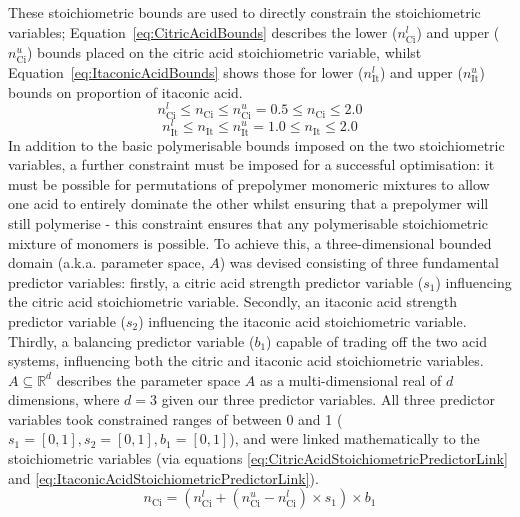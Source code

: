 These stoichiometric bounds are used to directly constrain the stoichiometric 
 variables; Equation~\ref{eq:CitricAcidBounds} describes the lower 
 (\(n_{\text{Ci}}^{l}\)) and upper (\(n_{\text{Ci}}^{u}\)) bounds placed on the citric acid 
 stoichiometric variable, whilst Equation~\ref{eq:ItaconicAcidBounds} 
 shows those for lower (\(n_{\text{It}}^{l}\)) and upper (\(n_{\text{It}}^{u}\))
 bounds on proportion of itaconic acid.
\begin{equation}\label{eq:CitricAcidBounds}
    n_{\text{Ci}}^{l}\leq n_{\text{Ci}}\leq n_{\text{Ci}}^{u}=0.5\leq n_{\text{Ci}}\leq 2.0
\end{equation}
\begin{equation}\label{eq:ItaconicAcidBounds}
    n_{\text{It}}^{l}\leq n_{\text{It}}\leq n_{\text{It}}^{u}=1.0\leq n_{\text{It}}\leq 2.0
\end{equation}
In addition to the basic polymerisable bounds imposed on the two
 stoichiometric variables, a further constraint must be imposed for a
 successful optimisation: it must be possible for permutations of
 prepolymer monomeric mixtures to allow one acid to entirely dominate the
 other whilst ensuring that a prepolymer will still polymerise - this
 constraint ensures that any polymerisable stoichiometric mixture of
 monomers is possible.
To achieve this, a three-dimensional bounded domain (a.k.a. parameter
 space, \(A\)) was devised consisting of three fundamental predictor
 variables: firstly, a citric acid strength predictor variable (\(s_1\))
 influencing the citric acid stoichiometric variable.
Secondly, an itaconic acid strength predictor variable (\(s_2\)) influencing
 the itaconic acid stoichiometric variable.
Thirdly, a balancing predictor variable (\(b_1\)) capable of trading off
 the two acid systems, influencing both the citric and itaconic acid
 stoichiometric variables.
\(A\subseteq \mathbb{R}^{d}\) describes the parameter space \(A\) as 
 a multi-dimensional real of \(d\) dimensions, where \(d=3\) given our
 three predictor variables.
All three predictor variables took constrained ranges of between 0 and 1 
 (\(s_1=[0,1],s_2=[0,1],b_1=[0,1]\)), and were linked mathematically to the 
 stoichiometric variables (via equations
 \ref{eq:CitricAcidStoichiometricPredictorLink}
 and \ref{eq:ItaconicAcidStoichiometricPredictorLink}).
\begin{equation}\label{eq:CitricAcidStoichiometricPredictorLink}
    n_{\text{Ci}}=(n_{\text{Ci}}^{l}+(n_{\text{Ci}}^{u}-n_{\text{Ci}}^{l})\times s_{1})\times b_{1}
\end{equation}
